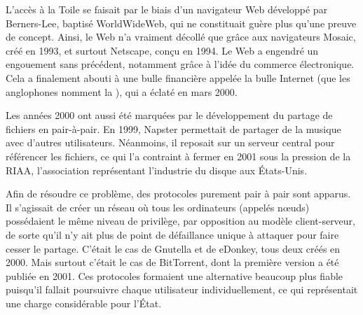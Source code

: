 L'accès à la Toile se faisait par le biais d'un navigateur Web développé par Berners-Lee, baptisé WorldWideWeb, qui ne constituait guère plus qu'une preuve de concept. Ainsi, le Web n'a vraiment décollé que grâce aux navigateurs Mosaic, créé en 1993, et surtout Netscape, conçu en 1994. Le Web a engendré un engouement sans précédent, notamment grâce à l'idée du commerce électronique. Cela a finalement abouti à une bulle financière appelée la bulle Internet (que les anglophones nomment la ), qui a éclaté en mars 2000.

Les années 2000 ont aussi été marquées par le développement du partage de fichiers en pair-à-pair. En 1999, Napster permettait de partager de la musique avec d'autres utilisateurs. Néanmoins, il reposait sur un serveur central pour référencer les fichiers, ce qui l'a contraint à fermer en 2001 sous la pression de la RIAA, l'association représentant l'industrie du disque aux États-Unis.

Afin de résoudre ce problème, des protocoles purement pair à pair sont apparus. Il s'agissait de créer un réseau où tous les ordinateurs (appelés nœuds) possédaient le même niveau de privilège, par opposition au modèle client-serveur, de sorte qu'il n'y ait plus de point de défaillance unique à attaquer pour faire cesser le partage. C'était le cas de Gnutella et de eDonkey, tous deux créés en 2000. Mais surtout c'était le cas de BitTorrent, dont la première version a été publiée en 2001. Ces protocoles formaient une alternative beaucoup plus fiable puisqu'il fallait poursuivre chaque utilisateur individuellement, ce qui représentait une charge considérable pour l'État.



